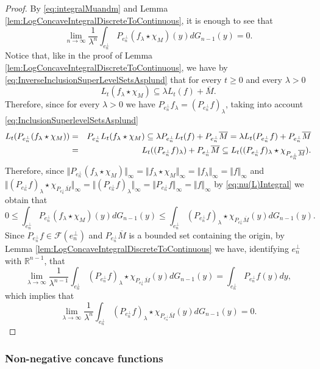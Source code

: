\documentclass{amsart}
\newcommand{\R}{\mathbb R}
\theoremstyle{remark}
\theoremstyle{definition}
\numberwithin{equation}{section}
\begin{document}
\begin{proof}
By \eqref{eq:integralMuandm} and Lemma \ref{lem:LogConcaveIntegralDiscreteToContinuous}, it is enough to see that
$$
\lim_{n\to\infty}\frac{1}{\lambda^n}\int_{e_n^\perp}P_{e_n^\perp}(f_\lambda\star\chi_{M})(y)dG_{n-1}(y)=0.
$$
Notice that, like in the proof of Lemma \ref{lem:LogConcaveIntegralDiscreteToContinuous}, we have by \eqref{eq:InverseInclusionSuperLevelSetsAsplund} that for every $t\geq0$ and every $\lambda>0$
$$
L_t(f_\lambda\star\chi_M)\subseteq \lambda L_t(f)+\overline{M}.
$$
Therefore, since for every $\lambda>0$ we have $P_{e_n^\perp}f_\lambda=(P_{e_n^\perp}f)_\lambda$,  taking into account \eqref{eq:InclusionSuperlevelSetsAsplund}
\begin{eqnarray*}
L_t(P_{e_n^\perp}(f_\lambda\star\chi_M))&= &P_{e_n^\perp}L_t(f_\lambda\star\chi_M)\subseteq \lambda P_{e_n^\perp}L_t(f)+P_{e_n^\perp}\overline{M}= \lambda L_t(P_{e_n^\perp}f)+P_{e_n^\perp}\overline{M}\cr
&=&L_t((P_{e_n^\perp}f)_\lambda)+P_{e_n^\perp}\overline{M}\subseteq L_t((P_{e_n^\perp}f)_\lambda\star\chi_{P_{e_n^\perp}\overline{M}}).
\end{eqnarray*}
Therefore, since  $\Vert P_{e_n^\perp}(f_\lambda\star\chi_M)\Vert_\infty=\Vert f_\lambda\star\chi_M\Vert_\infty=\Vert f_\lambda\Vert_\infty=\Vert f\Vert_\infty$ and
$\Vert(P_{e_n^\perp}f)_\lambda\star\chi_{P_{e_n^\perp}\overline{M}}\Vert_\infty=\Vert (P_{e_n^\perp}f)_\lambda\Vert_\infty=\Vert P_{e_n^\perp}f\Vert_\infty=\Vert f\Vert_\infty$ by \eqref{eq:nu(L)Integral} we obtain that
$$
0\leq\int_{e_n^\perp}P_{e_n^\perp}(f_\lambda\star\chi_M)(y)dG_{n-1}(y)\leq\int_{e_n^\perp}(P_{e_n^\perp}f)_\lambda\star\chi_{P_{e_n^\perp}\overline{M}}(y)dG_{n-1}(y).
$$
Since $P_{e_n^\perp}f\in\mathcal{F}(e_n^\perp)$ and $P_{e_n^\perp}\overline{M}$ is a bounded set containing the origin, by Lemma \ref{lem:LogConcaveIntegralDiscreteToContinuous} we have, identifying $e_n^\perp$ with $\R^{n-1}$, that
$$
\lim_{\lambda\to\infty}\frac{1}{\lambda^{n-1}}\int_{e_n^\perp}(P_{e_n^\perp}f)_\lambda\star\chi_{P_{e_n^\perp}\overline{M}}(y)dG_{n-1}(y)=\int_{e_n^\perp}P_{e_n^\perp}f(y)dy,
$$
which implies that
$$
\lim_{\lambda\to\infty}\frac{1}{\lambda^n}\int_{e_n^\perp}(P_{e_n^\perp}f)_\lambda\star\chi_{P_{e_n^\perp}\overline{M}}(y)dG_{n-1}(y)=0.
$$

\end{proof}
\subsubsection{Non-negative concave functions}
\end{document}
